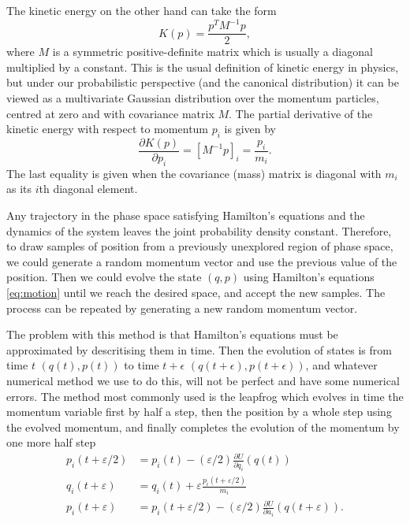 The kinetic energy on the other hand can take the form 
\begin{equation}
K(p)= \frac{p^T M^{-1}p}{2},
\end{equation}
where $M$ is a symmetric positive-definite matrix which is usually a diagonal multiplied by a constant. This is the usual definition of kinetic energy in physics, but under our probabilistic perspective (and the canonical distribution) it can be viewed as a multivariate Gaussian distribution over the momentum particles, centred at zero and with covariance matrix $M$. The partial derivative of the kinetic energy with respect to momentum $p_i$ is given by
\begin{equation}
	\frac{\partial K(p)}{\partial p_i} = [M^{-1}p]_i = \frac{p_i}{m_i}.
\end{equation}
The last equality is given when the covariance (mass) matrix is diagonal with $m_i$ as its $i$th diagonal element. 

Any trajectory in the phase space satisfying Hamilton's equations and the dynamics of the system leaves the joint probability density constant. Therefore, to draw samples of position from a previously unexplored region of phase space, we could generate a random momentum vector and use the previous value of the position. Then we could evolve the state $(q,p)$ using Hamilton's equations \eqref{eq:motion} until we reach the desired space, and accept the new samples. The process can be repeated by generating a new random momentum vector.


The problem with this method is that Hamilton's equations must be approximated by descritising them in time. Then the evolution of states is from time $t$ $(q(t),p(t))$ to time $t+\epsilon$ $(q(t+\epsilon),p(t+\epsilon))$, and whatever numerical method we use to do this, will not be perfect and have some numerical errors. The method most commonly used is the leapfrog which evolves in time the momentum variable first by half a step, then the position by a whole step using the evolved momentum, and finally completes the evolution of the momentum by one more half step
\begin{align}
 p_{i}(t+\varepsilon / 2) &=p_{i}(t)-(\varepsilon / 2) \frac{\partial U}{\partial q_{i}}(q(t)) \\ q_{i}(t+\varepsilon) &=q_{i}(t)+\varepsilon \frac{p_{i}(t+\varepsilon / 2)}{m_{i}} \\ p_{i}(t+\varepsilon) &=p_{i}(t+\varepsilon / 2)-(\varepsilon / 2) \frac{\partial U}{\partial a_{i}}(q(t+\varepsilon)) .
\end{align}

